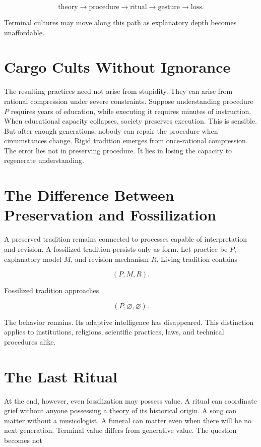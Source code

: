 \documentclass[11pt,oneside]{book}
\theoremstyle{definition}
\theoremstyle{remark}
\begin{document}
\[
\text{theory} \rightarrow \text{procedure} \rightarrow \text{ritual} \rightarrow \text{gesture} \rightarrow \text{loss}.
\]

Terminal cultures may move along this path as explanatory depth becomes unaffordable.

\section{Cargo Cults Without Ignorance}

The resulting practices need not arise from stupidity. They can arise from rational compression
under severe constraints. Suppose understanding procedure \(P\) requires years of education, while
executing it requires minutes of instruction. When educational capacity collapses, society preserves
execution. This is sensible. But after enough generations, nobody can repair the procedure when
circumstances change. Rigid tradition emerges from once-rational compression. The error lies not in
preserving procedure. It lies in losing the capacity to regenerate understanding.

\section{The Difference Between Preservation and Fossilization}

A preserved tradition remains connected to processes capable of interpretation and revision. A
fossilized tradition persists only as form. Let practice be \(P\), explanatory model \(M\), and
revision mechanism \(R\). Living tradition contains

\[
(P,M,R).
\]

Fossilized tradition approaches

\[
(P,\varnothing,\varnothing).
\]

The behavior remains. Its adaptive intelligence has disappeared. This distinction applies to
institutions, religions, scientific practices, laws, and technical procedures alike.

\section{The Last Ritual}

At the end, however, even fossilization may possess value. A ritual can coordinate grief without
anyone possessing a theory of its historical origin. A song can matter without a musicologist. A
funeral can matter even when there will be no next generation. Terminal value differs from
generative value. The question becomes not
\end{document}
